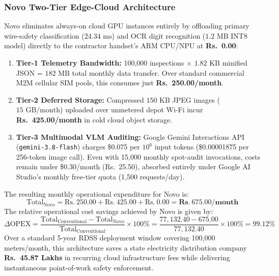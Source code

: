 \documentclass[12pt,a4paper,oneside]{report}
\begin{document}
\subsubsection{Novo Two-Tier Edge-Cloud Architecture}
Novo eliminates always-on cloud GPU instances entirely by offloading primary wire-safety classification ($24.34\text{~ms}$) and OCR digit recognition ($1.2\text{~MB}$ INT8 model) directly to the contractor handset's ARM CPU/NPU at \textbf{Rs.~0.00}:
\begin{enumerate}
    \item \textbf{Tier-1 Telemetry Bandwidth:} 100,000 inspections $\times$ $1.82\text{~KB}$ minified JSON = $182\text{~MB}$ total monthly data transfer. Over standard commercial M2M cellular SIM pools, this consumes just \textbf{Rs.~250.00/month}.
    \item \textbf{Tier-2 Deferred Storage:} Compressed $150\text{~KB}$ JPEG images ($15\text{~GB/month}$) uploaded over unmetered depot Wi-Fi incur \textbf{Rs.~425.00/month} in cold cloud object storage.
    \item \textbf{Tier-3 Multimodal VLM Auditing:} Google Gemini Interactions API (\texttt{gemini-3.8-flash}) charges \$0.075 per $10^6$ input tokens (\$0.00001875 per 256-token image call). Even with 15,000 monthly spot-audit invocations, costs remain under \$0.30/month (Rs.~25.50), absorbed entirely under Google AI Studio's monthly free-tier quota (1,500 requests/day).
\end{enumerate}
The resulting monthly operational expenditure for Novo is:
\begin{equation}
\text{Total}_{\text{Novo}} = \text{Rs.}~250.00 + \text{Rs.}~425.00 + \text{Rs.}~0.00 = \mathbf{\text{Rs.}~675.00/\text{month}}
\end{equation}
The relative operational cost savings achieved by Novo is given by:
\begin{equation}
\Delta\text{OPEX} = \frac{\text{Total}_{\text{Conventional}} - \text{Total}_{\text{Novo}}}{\text{Total}_{\text{Conventional}}} \times 100\% = \frac{77,132.40 - 675.00}{77,132.40} \times 100\% = \mathbf{99.12\%}
\end{equation}
Over a standard 5-year RDSS deployment window covering 100,000 meters/month, this architecture saves a state electricity distribution company \textbf{Rs.~45.87 Lakhs} in recurring cloud infrastructure fees while delivering instantaneous point-of-work safety enforcement.

\clearpage

\end{document}
